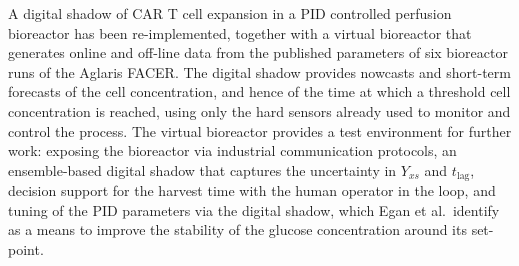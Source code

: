 \documentclass[11pt,a4paper]{article}
\newcommand{\tlag}{t_{\mathrm{lag}}}
\begin{document}
A digital shadow of CAR T cell expansion in a PID controlled perfusion bioreactor has been
re-implemented, together with a virtual bioreactor that generates online and off-line data from the
published parameters of six bioreactor runs of the Aglaris FACER. The digital shadow provides nowcasts
and short-term forecasts of the cell concentration, and hence of the time at which a threshold cell
concentration is reached, using only the hard sensors already used to monitor and control the process.
The virtual bioreactor provides a test environment for further work: exposing the bioreactor via
industrial communication protocols, an ensemble-based digital shadow that captures the uncertainty in
$Y_{xs}$ and $\tlag$, decision support for the harvest time with the human operator in the loop, and
tuning of the PID parameters via the digital shadow, which Egan et al.\ identify as a means to improve
the stability of the glucose concentration around its set-point.

\end{document}

